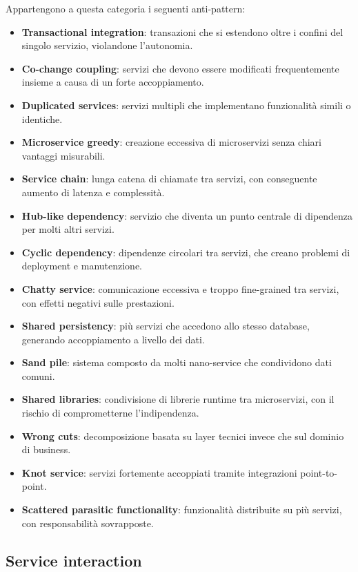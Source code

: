 Appartengono a questa categoria i seguenti anti-pattern:
\begin{itemize}
  \item \textbf{Transactional integration}: transazioni che si estendono oltre i confini del singolo servizio, violandone l’autonomia.
  \item \textbf{Co-change coupling}: servizi che devono essere modificati frequentemente insieme a causa di un forte accoppiamento.
  \item \textbf{Duplicated services}: servizi multipli che implementano funzionalità simili o identiche.
  \item \textbf{Microservice greedy}: creazione eccessiva di microservizi senza chiari vantaggi misurabili.
  \item \textbf{Service chain}: lunga catena di chiamate tra servizi, con conseguente aumento di latenza e complessità.
  \item \textbf{Hub-like dependency}: servizio che diventa un punto centrale di dipendenza per molti altri servizi.
  \item \textbf{Cyclic dependency}: dipendenze circolari tra servizi, che creano problemi di deployment e manutenzione.
  \item \textbf{Chatty service}: comunicazione eccessiva e troppo fine-grained tra servizi, con effetti negativi sulle prestazioni.
  \item \textbf{Shared persistency}: più servizi che accedono allo stesso database, generando accoppiamento a livello dei dati.
  \item \textbf{Sand pile}: sistema composto da molti nano-service che condividono dati comuni.
  \item \textbf{Shared libraries}: condivisione di librerie runtime tra microservizi, con il rischio di comprometterne l’indipendenza.
  \item \textbf{Wrong cuts}: decomposizione basata su layer tecnici invece che sul dominio di business.
  \item \textbf{Knot service}: servizi fortemente accoppiati tramite integrazioni point-to-point.
  \item \textbf{Scattered parasitic functionality}: funzionalità distribuite su più servizi, con responsabilità sovrapposte.
\end{itemize}

\subsection{Service interaction}

